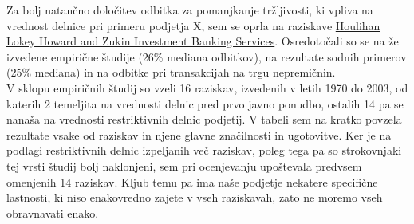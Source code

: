 \documentclass[12pt,a4paper]{amsart}
\theoremstyle{definition} %
\theoremstyle{plain} %
\begin{document}
\begin{itemize}
Za bolj natančno določitev odbitka za pomanjkanje tržljivosti, ki vpliva na vrednost delnice pri primeru podjetja X, sem se oprla na raziskave \underline{Houlihan Lokey Howard and Zukin Investment Banking Services}. Osredotočali so se na že izvedene empirične študije (26\% mediana odbitkov), na rezultate sodnih primerov (25\% mediana) in na odbitke pri transakcijah na trgu nepremičnin.\\
V sklopu empiričnih študij so vzeli 16 raziskav, izvedenih v letih 1970 do 2003, od katerih 2 temeljita na vrednosti delnic pred prvo javno ponudbo, ostalih 14 pa se nanaša na vrednosti restriktivnih delnic podjetij. V tabeli sem na kratko povzela rezultate vsake od raziskav in njene glavne značilnosti in ugotovitve. Ker je na podlagi restriktivnih delnic izpeljanih več raziskav, poleg tega pa so strokovnjaki tej vrsti študij bolj naklonjeni, sem pri ocenjevanju upoštevala predvsem omenjenih 14 raziskav. Kljub temu pa ima naše podjetje nekatere specifične lastnosti, ki niso enakovredno zajete v vseh raziskavah, zato ne moremo vseh obravnavati enako.\par


\end{itemize}
\end{document}
